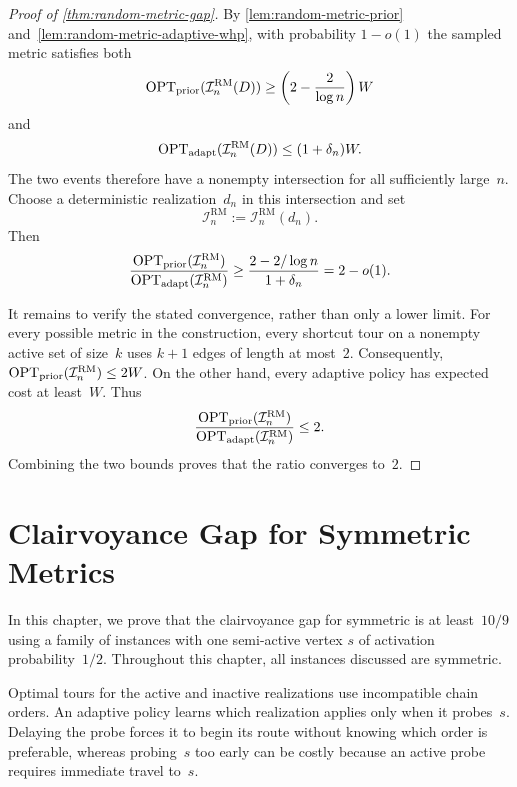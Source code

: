 \documentclass[12pt,a4paper,oneside]{report}
\begin{document}
\begin{proof}[Proof of \cref{thm:random-metric-gap}]
By \cref{lem:random-metric-prior}
and~\cref{lem:random-metric-adaptive-whp}, with probability $1-o(1)$ the
sampled metric satisfies both
\[
    \operatorname{OPT}_\mathrm{prior}(\mathcal{I}_n^{\mathrm{RM}}(D))
    \ge
    \left(2-\frac{2}{\log n}\right)W
\]
and
\[
    \operatorname{OPT}_\mathrm{adapt}(\mathcal{I}_n^{\mathrm{RM}}(D))
    \le(1+\delta_n)W.
\]
The two events therefore have a nonempty intersection for all sufficiently
large~$n$.  Choose a deterministic realization~$d_n$ in this intersection
and set
\[
    \mathcal{I}_n^{\mathrm{RM}}
    :=\mathcal{I}_n^{\mathrm{RM}}(d_n).
\]
Then
\[
    \frac{\operatorname{OPT}_\mathrm{prior}(\mathcal{I}_n^{\mathrm{RM}})}
         {\operatorname{OPT}_\mathrm{adapt}(\mathcal{I}_n^{\mathrm{RM}})}
    \ge
    \frac{2-2/\log n}{1+\delta_n}
    =
    2-o(1).
\]

It remains to verify the stated convergence, rather than only a lower limit.
For every possible metric in the construction, every shortcut tour on a
nonempty active set of size~$k$ uses $k+1$ edges of length at most~$2$.
Consequently, $\operatorname{OPT}_\mathrm{prior}(\mathcal{I}_n^{\mathrm{RM}})\le2W$.  On the other
hand, every adaptive policy has expected cost at least~$W$.  Thus
\[
    \frac{\operatorname{OPT}_\mathrm{prior}(\mathcal{I}_n^{\mathrm{RM}})}
         {\operatorname{OPT}_\mathrm{adapt}(\mathcal{I}_n^{\mathrm{RM}})}
    \le2.
\]
Combining the two bounds proves that the ratio converges to~$2$.
\end{proof}

\chapter{Clairvoyance Gap for Symmetric Metrics}\label{ch:sym-clair}

\providecommand{\Gammaone}{\Gamma_{1}}
\newcommand{\threechaininstance}[1]{\mathcal{I}_{#1}^{\mathrm{3C}}}

In this chapter, we prove that the clairvoyance gap for symmetric \StochTSP{}
is at least~$10/9$ using a family of instances with one semi-active vertex
$s$ of activation probability~$1/2$.
Throughout this chapter, all instances discussed are symmetric.

Optimal tours for the active and inactive realizations use incompatible chain
orders.  An adaptive policy learns which realization applies only when it
probes~$s$.  Delaying the probe forces it to begin its route without knowing
which order is preferable, whereas probing~$s$ too early can be costly because
an active probe requires immediate travel to~$s$.
\end{document}
